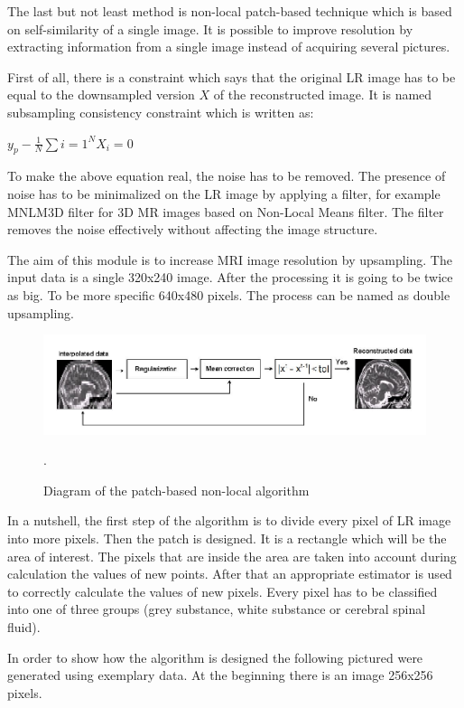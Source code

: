 The last but not least method is non-local patch-based technique which is based on self-similarity of a single image. It is possible to improve resolution by extracting information from a single image instead of acquiring several pictures.

First of all, there is a constraint which says that the original LR image has to be equal to the downsampled version $X$ of the reconstructed image. It is named subsampling consistency constraint which is written as:
\newline \centerline{$y_{p}-\frac{1}{N}\sum{i=1}^{N}X_{i}=0$}
\newline
\newline To make the above equation real, the noise has to be removed. The presence of noise has to be minimalized on the LR image by applying a filter, for example MNLM3D filter for 3D MR images based on Non-Local Means filter. The filter removes the noise effectively without affecting the image structure. 


The aim of this module is to increase MRI image resolution by upsampling.
The input data is a single 320x240 image. After the processing it
is going to be twice as big. To be more specific 640x480 pixels. The
process can be named as double upsampling.

\begin{figure}[H]
\centering{}\includegraphics[scale=0.5]{figures/Module_10/Module_10_1}\caption{Diagram of the patch-based non-local algorithm \cite{9art1}}. 
\label{fig: Module10_1}
\end{figure}

In a nutshell, the first step of the algorithm is to divide every pixel of LR image into more pixels. Then the patch is designed. It is a rectangle which will be the area of interest. The pixels that are inside the area are taken into account during calculation the values of new points.
After that an appropriate estimator is used to correctly calculate the values of new pixels. Every pixel has to be classified into one of three groups (grey substance, white substance or cerebral spinal fluid).

In order to show how the algorithm is designed the following pictured were generated using exemplary data. At the beginning there is an image 256x256 pixels. 

